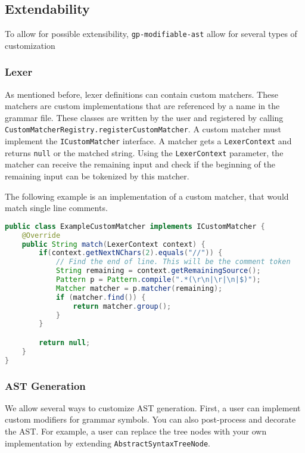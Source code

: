 \subsection{Extendability}

To allow for possible extensibility, \verb|gp-modifiable-ast| allow for several types of customization

\subsubsection{Lexer}

As mentioned before, lexer definitions can contain custom matchers. 
These matchers are custom implementations that are referenced by a name in the grammar file. 
These classes are written by the user and registered by calling \lstinline|CustomMatcherRegistry.registerCustomMatcher|. 
A custom matcher must implement the \verb|ICustomMatcher| interface. 
A matcher gets a \verb|LexerContext| and returns \verb|null| or the matched string. 
Using the \verb|LexerContext| parameter, the matcher can receive the remaining input and check if the beginning of the remaining input can be tokenized by this matcher.

The following example is an implementation of a custom matcher, that would match single line comments.

\begin{lstlisting}[language=Java, caption=Example of a custom matcher]
public class ExampleCustomMatcher implements ICustomMatcher {
    @Override
    public String match(LexerContext context) {
        if(context.getNextNChars(2).equals("//")) {
            // Find the end of line. This will be the comment token
            String remaining = context.getRemainingSource();
            Pattern p = Pattern.compile(".*(\r\n|\r|\n|$)");
            Matcher matcher = p.matcher(remaining);
            if (matcher.find()) {
                return matcher.group();
            }
        }

        return null;
    }
}
\end{lstlisting}

\subsubsection{AST Generation}

We allow several ways to customize AST generation. 
First, a user can implement custom modifiers for grammar symbols.
You can also post-process and decorate the AST. 
For example, a user can replace the tree nodes with your own implementation by extending \verb|AbstractSyntaxTreeNode|.

